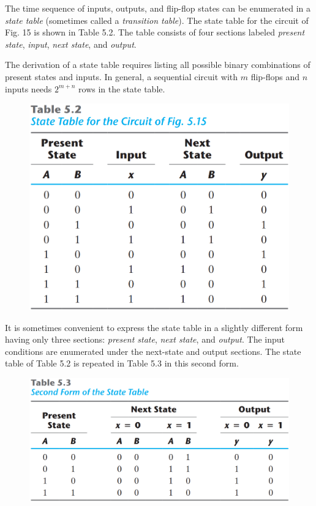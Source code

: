 The time sequence of inputs, outputs, and flip-flop states can be enumerated in a \textit{state table} (sometimes called a \textit{transition table}). The state table for the circuit of Fig. 15 is shown in Table 5.2. The table consists of four sections labeled \textit{present state}, \textit{input}, \textit{next state}, and \textit{output}.

\noindent The derivation of a state table requires listing all possible binary combinations of present states and inputs. In general, a sequential circuit with $m$ flip-flops and $n$ inputs needs $2^{m + n}$ rows in the state table.

\vspace*{\fill}
\columnbreak

\begin{figure}[H]
  \centering
  \includegraphics[width=.8\linewidth]{img/table-5.2.png}
  \label{table:5.2}
\end{figure}

It is sometimes convenient to express the state table in a slightly different form having only three sections: \textit{present state}, \textit{next state}, and \textit{output}. The input conditions are enumerated under the next-state and output sections. The state table of Table 5.2 is  repeated in Table 5.3 in this second form.
\begin{figure}[H]
  \centering
  \includegraphics[width=.9\linewidth]{img/table-5.3.png}
  \label{table:5.3}
\end{figure}

